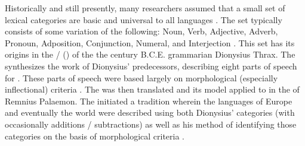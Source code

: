 Historically and still presently, many researchers assumed that a small set of lexical categories are basic and universal to all languages \parencites[81]{BolingerSears1981}[2]{Croft1991}[32]{Payne1997}[95]{Stassen2011}. The set typically consists of some variation of the following: Noun, Verb, Adjective, Adverb, Pronoun, Adposition, Conjunction, Numeral, and Interjection \parencite[16538]{Haspelmath2001}. This set has its origins in the  /  () of the the  century B.C.E. grammarian Dionysius Thrax. The  synthesizes the work of Dionysius' predecessors, describing eight parts of speech for . These parts of speech were based largely on morphological (especially inflectional) criteria \parencite[17--20]{Rauh2010}. The  was then translated and its model applied to  in the  of Remnius Palaemon. The  initiated a tradition wherein the languages of Europe and eventually the world  were described using both Dionysius' categories (with occasionally additions / subtractions) as well as his method of identifying those categories on the basis of morphological criteria \parencite[20]{Rauh2010}.

